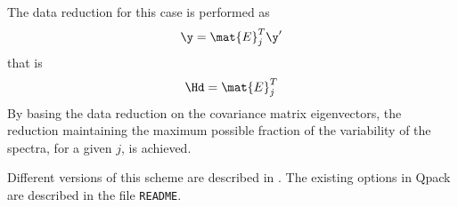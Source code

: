  The data reduction for this case is performed as
 \begin{equation}
   \y = \mat{E}^T_j \y'
 \end{equation}
 that is
 \begin{equation}
   \Hd = \mat{E}^T_j 
 \end{equation}
 By basing the data reduction on the covariance matrix eigenvectors,
 the reduction maintaining the maximum possible fraction of the
 variability of the spectra, for a given $j$, is achieved.

 Different versions of this scheme are described in \citet{eriksson:01c}. 
 The existing options in Qpack are described in the file \verb|README|.





